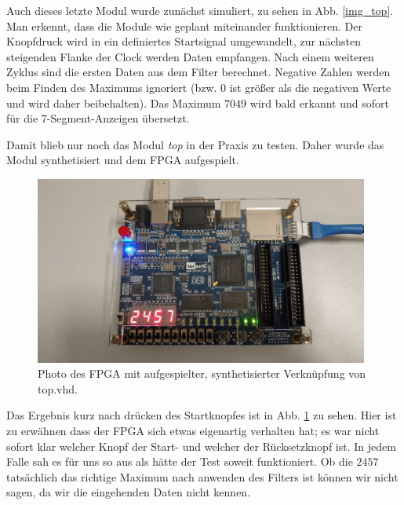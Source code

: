 Auch dieses letzte Modul wurde zunächst simuliert, zu sehen in Abb. \ref{img_top}.
Man erkennt, dass die Module wie geplant miteinander funktionieren.
Der Knopfdruck wird in ein definiertes Startsignal umgewandelt, zur nächsten steigenden Flanke der Clock werden Daten empfangen.
Nach einem weiteren Zyklus sind die ersten Daten aus dem Filter berechnet.
Negative Zahlen werden beim Finden des Maximums ignoriert (bzw. $0$ ist größer als die negativen Werte und wird daher beibehalten).
Das Maximum $7049$ wird bald erkannt und sofort für die 7-Segment-Anzeigen übersetzt.

Damit blieb nur noch das Modul \textit{top} in der Praxis zu testen.
Daher wurde das Modul synthetisiert und dem FPGA aufgespielt.

\begin{figure}[ht]
	\centering
    \includegraphics[width=0.98\textwidth]{../Daten/Photo_FPGA_top.png}
	\caption{Photo des FPGA mit aufgespielter, synthetisierter Verknüpfung von top.vhd.}
	\label{photo_top}
\end{figure}

Das Ergebnis kurz nach drücken des Startknopfes ist in Abb. \ref{photo_top} zu sehen.
Hier ist zu erwähnen dass der FPGA sich etwas eigenartig verhalten hat; es war nicht sofort klar welcher Knopf der Start- und welcher der Rücksetzknopf ist.
In jedem Falle sah es für uns so aus als hätte der Test soweit funktioniert.
Ob die $2457$ tatsächlich das richtige Maximum nach anwenden des Filters ist können wir nicht sagen, da wir die eingehenden Daten nicht kennen.


